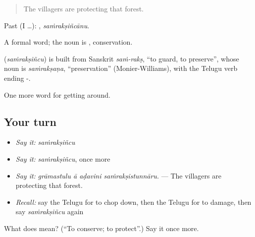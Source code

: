 \begin{quote}
The villagers are protecting that forest.
\end{quote}

Past (I …): , \emph{saṁrakṣiñcānu}.

A formal word; the noun is , conservation.

\begin{cousinweb}
\textbf{} (\emph{saṁrakṣiñcu}) is built from Sanskrit \emph{saṁ-rakṣ}, \textquotedblleft{}to guard, to preserve\textquotedblright{}, whose noun is \emph{saṁrakṣaṇa}, \textquotedblleft{}preservation\textquotedblright{} (Monier-Williams), with the Telugu verb ending -.
\end{cousinweb}

\begin{grammarlens}[title={What you've built}]
One more word for getting around.
\end{grammarlens}

\subsection*{Your turn}
\begin{itemize}
\raggedright
  \item \emph{Say it:} \emph{saṁrakṣiñcu}
  \item \emph{Say it:} \emph{saṁrakṣiñcu}, once more
  \item \emph{Say it:} \emph{grāmastulu ā aḍavini saṁrakṣistunnāru.} — The villagers are protecting that forest.
  \item \emph{Recall:} say the Telugu for to chop down, then the Telugu for to damage, then say \emph{saṁrakṣiñcu} again
\end{itemize}

\begin{tcolorbox}[breakable,colback=teal!4,colframe=teal!35!black,title={Before you move on}]
What does  mean? (\textquotedblleft{}To conserve; to protect\textquotedblright{}.) Say it once more.
\end{tcolorbox}
